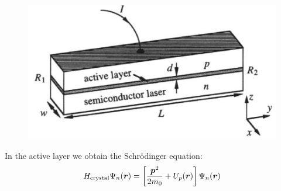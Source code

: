 \begin{minipage}{0.45\textwidth}
    \begin{figure}[h]
    \centering
    \includegraphics[width=1\textwidth]{images/semi_medium.png}
    \caption{}
\end{figure}
\end{minipage}
\hfill
\begin{minipage}{0.49\textwidth}
    In the active layer we obtain the Schr\"odinger equation:
    \begin{equation*}
	H_{\text{crystal}} \Psi_n(\mbox{\boldmath $r$}) = \left[\frac{\mbox{\boldmath $p$}^2}{2 m_0} + U_p(\mbox{\boldmath $r$})\right] \Psi_n(\mbox{\boldmath $r$})
\end{equation*}
\end{minipage}
